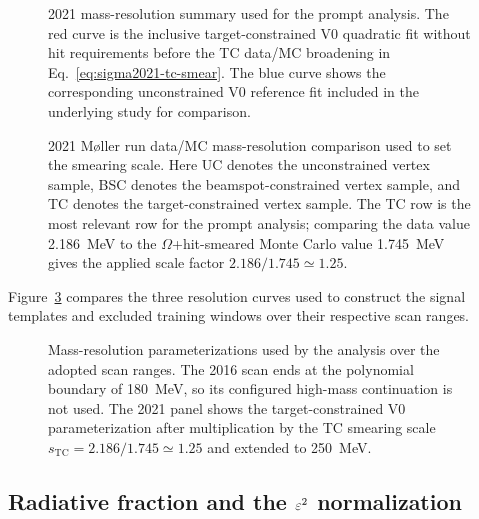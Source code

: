 \begin{figure}[H]
\centering
{}
\caption{2021 mass-resolution summary used for the prompt analysis. The red curve is
the inclusive target-constrained V0 quadratic fit without hit requirements before the
TC data/MC broadening in Eq.~\ref{eq:sigma2021-tc-smear}. The blue curve shows the
corresponding unconstrained V0 reference fit included in the underlying study for
comparison.}
\label{fig:2021-resolution}
\end{figure}

\begin{figure}[H]
\centering
{}
\caption{2021 M{\o}ller run data/MC mass-resolution comparison used to set the
smearing scale.
Here UC denotes the unconstrained vertex sample, BSC denotes the beamspot-constrained
vertex sample, and TC denotes the target-constrained vertex sample. The TC row is the
most relevant row for the prompt analysis; comparing the data value
\SI{2.186}{MeV} to the $\Omega$+hit-smeared Monte Carlo value \SI{1.745}{MeV}
gives the applied scale factor $2.186/1.745\simeq1.25$.}
\label{fig:2021-data-mc-smearing-scale}
\end{figure}

Figure~\ref{fig:mass-resolution-three-panel} compares the three resolution curves used
to construct the signal templates and excluded training windows over their respective
scan ranges.

\begin{figure}[H]
\centering
{}
\caption{Mass-resolution parameterizations used by the analysis over the adopted
scan ranges. The 2016 scan ends at the polynomial boundary of \SI{180}{MeV}, so its
configured high-mass continuation is not used. The 2021 panel shows the target-constrained V0 parameterization after
multiplication by the TC smearing scale $s_{\mathrm{TC}}=2.186/1.745\simeq1.25$ and
extended to \SI{250}{MeV}.}
\label{fig:mass-resolution-three-panel}
\end{figure}

\subsection{Radiative fraction and the \texorpdfstring{$\varepsilon^2$}{epsilon2} normalization}
\label{sec:radfrac}

